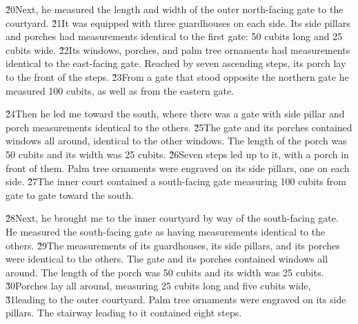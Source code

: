 \v{20}Next, he measured the length and width of the outer north-facing gate to the courtyard. \v{21}It was equipped with three guardhouses on each side. Its side pillars and porches had measurements identical to the first gate: 50 cubits long and 25 cubits wide. \v{22}Its windows, porches, and palm tree ornaments had measurements identical to the east-facing gate. Reached by seven ascending steps, its porch lay to the front of the steps. \v{23}From a gate that stood opposite the northern gate he measured 100 cubits, as well as from the eastern gate.

\v{24}Then he led me toward the south, where there was a gate with side pillar and porch measurements identical to the others. \v{25}The gate and its porches contained windows all around, identical to the other windows. The length of the porch was 50 cubits and its width was 25 cubits. \v{26}Seven steps led up to it, with a porch in front of them. Palm tree ornaments were engraved on its side pillars, one on each side. \v{27}The inner court contained a south-facing gate measuring 100 cubits from gate to gate toward the south.

\v{28}Next, he brought me to the inner courtyard by way of the south-facing gate. He measured the south-facing gate as having measurements identical to the others. \v{29}The measurements of its guardhouses, its side pillars, and its porches were identical to the others. The gate and its porches contained windows all around. The length of the porch was 50 cubits and its width was 25 cubits. \v{30}Porches lay all around, measuring 25 cubits long and five cubits wide, \v{31}leading to the outer courtyard. Palm tree ornaments were engraved on its side pillars. The stairway leading to it contained eight steps.

